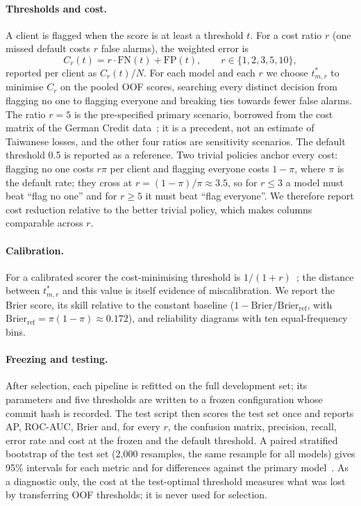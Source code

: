 \documentclass{article}
\newcommand{\FN}{\mathrm{FN}}
\newcommand{\FP}{\mathrm{FP}}
\begin{document}
\paragraph{Thresholds and cost.} A client is flagged when the score is at least a threshold $t$. For a cost ratio $r$ (one missed default costs $r$ false alarms), the weighted error is
\begin{equation}
  C_r(t) = r\cdot\FN(t) + \FP(t), \qquad r\in\{1,2,3,5,10\},
  \label{eq:cost}
\end{equation}
reported per client as $C_r(t)/N$. For each model and each $r$ we choose $t^\ast_{m,r}$ to minimise $C_r$ on the pooled OOF scores, searching every distinct decision from flagging no one to flagging everyone and breaking ties towards fewer false alarms. The ratio $r=5$ is the pre-specified primary scenario, borrowed from the cost matrix of the German Credit data~\citep{german_credit}; it is a precedent, not an estimate of Taiwanese losses, and the other four ratios are sensitivity scenarios. The default threshold 0.5 is reported as a reference. Two trivial policies anchor every cost: flagging no one costs $r\pi$ per client and flagging everyone costs $1-\pi$, where $\pi$ is the default rate; they cross at $r=(1-\pi)/\pi\approx3.5$, so for $r\le3$ a model must beat ``flag no one'' and for $r\ge5$ it must beat ``flag everyone''. We therefore report cost reduction relative to the better trivial policy, which makes columns comparable across $r$.

\paragraph{Calibration.} For a calibrated scorer the cost-minimising threshold is $1/(1+r)$~\citep{elkan2001foundations}; the distance between $t^\ast_{m,r}$ and this value is itself evidence of miscalibration. We report the Brier score, its skill relative to the constant baseline ($1-\mathrm{Brier}/\mathrm{Brier}_{\mathrm{ref}}$, with $\mathrm{Brier}_{\mathrm{ref}}=\pi(1-\pi)\approx0.172$), and reliability diagrams with ten equal-frequency bins.

\paragraph{Freezing and testing.} After selection, each pipeline is refitted on the full development set; its parameters and five thresholds are written to a frozen configuration whose commit hash is recorded. The test script then scores the test set once and reports AP, ROC-AUC, Brier and, for every $r$, the confusion matrix, precision, recall, error rate and cost at the frozen and the default threshold. A paired stratified bootstrap of the test set (2{,}000 resamples, the same resample for all models) gives 95\% intervals for each metric and for differences against the primary model~\citep{efron1994introduction}. As a diagnostic only, the cost at the test-optimal threshold measures what was lost by transferring OOF thresholds; it is never used for selection.
\end{document}

